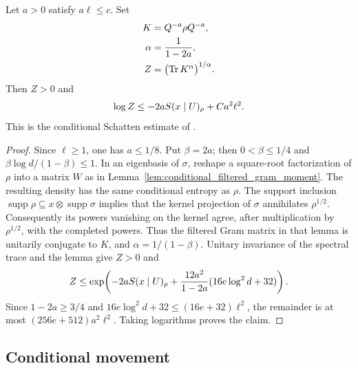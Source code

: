 \begin{theorem}
    \label{thm:conditional_schatten_log}
    \leanok
    Let $a>0$ satisfy $a\ell\le c$. Set
    \begin{align}
        K&=Q^{-a}\rho Q^{-a},\notag\\
        \alpha&=\frac1{1-2a},\notag\\
        Z&=\bigl(\operatorname{Tr}K^\alpha\bigr)^{1/\alpha}.
        \label{eq:conditional_schatten_quantity}
    \end{align}
    Then $Z>0$ and
    \begin{align}
        \log Z\le-2aS(x\mid U)_\rho+Ca^2\ell^2.\notag
    \end{align}
    This is the conditional Schatten estimate of
    \cite[Section~5.1]{OpenAI2026AreaLaw}.
\end{theorem}
\begin{proof}\leanok
    Since $\ell\ge1$, one has $a\le1/8$. Put $\beta=2a$; then
    $0<\beta\le1/4$ and
    $\beta\log d/(1-\beta)\le1$.
    In an eigenbasis of $\sigma$, reshape a square-root factorization of
    $\rho$ into a matrix $W$ as in
    Lemma~\ref{lem:conditional_filtered_gram_moment}.
    The resulting density has the same conditional entropy as $\rho$.
    The support inclusion
    $\operatorname{supp}\rho\subseteq x\otimes\operatorname{supp}\sigma$
    implies that the kernel projection of $\sigma$ annihilates
    $\rho^{1/2}$. Consequently its powers vanishing on the kernel agree,
    after multiplication by $\rho^{1/2}$, with the completed powers.
    Thus the filtered Gram matrix in that lemma is unitarily conjugate
    to $K$, and $\alpha=1/(1-\beta)$.
    Unitary invariance of the spectral trace and the lemma give $Z>0$ and
    \begin{align}
        Z\le\exp\!\left(-2aS(x\mid U)_\rho+
            \frac{12a^2}{1-2a}(16e\log^2d+32)\right).\notag
    \end{align}
    Since $1-2a\ge3/4$ and
    $16e\log^2d+32\le(16e+32)\ell^2$, the remainder is at most
    $(256e+512)a^2\ell^2$. Taking logarithms proves the claim.
\end{proof}


\subsection{Conditional movement}

